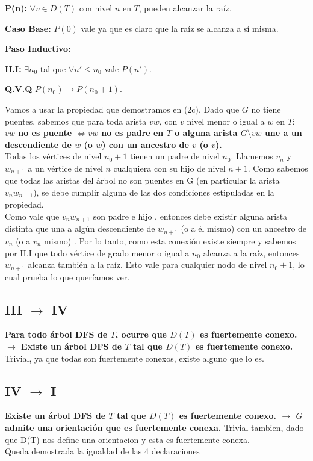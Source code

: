 \documentclass{article}
\begin{document}
\textbf{P(n):} $\forall v \in D(T)$ con nivel $n$ en $T$, pueden alcanzar la raíz.

\textbf{Caso Base:} $P(0)$ vale ya que es claro que la raíz se alcanza a sí misma.

\textbf{Paso Inductivo:}

\textbf{H.I:} $\exists n_0$ tal que $\forall n' \leq n_0$ vale $P(n')$.

\textbf{Q.V.Q} $P(n_0) \rightarrow P(n_0 + 1)$.

Vamos a usar la propiedad que demostramos en (2c). Dado que $G$ no tiene puentes, sabemos que para toda arista $vw$, con $v$ nivel menor o igual a $w$ en $T$:\\

\textbf{$vw$ no es puente $\Leftrightarrow vw$ no es padre en $T$ o alguna arista $G\setminus vw$ une a un descendiente de $w$ (o $w$) con un ancestro de $v$ (o $v$).}\\

Todas los vértices de nivel $n_0 + 1$ tienen un padre de nivel $n_0$. Llamemos $v_{n}$ y $w_{n+1}$ a un vértice de nivel $n$ cualquiera con su hijo de nivel $n + 1$. Como sabemos que todas las aristas del árbol no son puentes en G (en particular la arista $v_{n} w_{n+1}$), se debe cumplir alguna de las dos condiciones estipuladas en la propiedad.\\
 Como vale que $v_{n} w_{n+1}$ son padre e hijo , entonces debe existir alguna arista distinta que una a algún descendiente de $w_{n+1}$ (o a él mismo) con un ancestro de $v_{n}$ (o a $v_{n}$ mismo) . Por lo tanto, como esta conexión existe siempre y sabemos por H.I que todo vértice de grado menor o igual a $n_0$ alcanza a la raíz, entonces $w_{n+1}$ alcanza también a la raíz. Esto vale para  cualquier nodo de nivel $n_0 + 1$, lo cual prueba lo que queríamos ver.

\subsection*{III $\rightarrow$ IV}
 \textbf{Para todo árbol DFS de $T$, ocurre que $D(T)$ es fuertemente conexo. $\rightarrow$ Existe un árbol DFS de $T$ tal que $D(T)$ es fuertemente conexo.}
 Trivial, ya que todas son fuertemente conexos, existe alguno que lo es.
\subsection*{IV $\rightarrow$ I}
\textbf{Existe un árbol DFS de $T$ tal que $D(T)$ es fuertemente conexo. $\rightarrow$ $G$ admite una orientación que es fuertemente conexa.}
Trivial tambien, dado que D(T) nos define una orientacion y esta es fuertemente conexa.\\

Queda demostrada la igualdad de las 4 declaraciones
\end{document}
